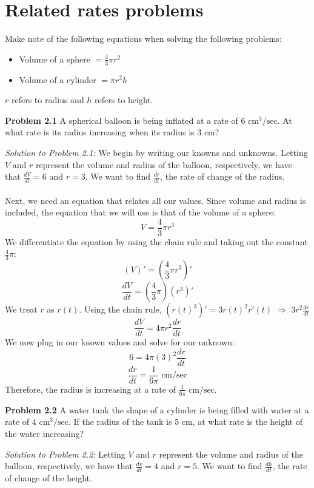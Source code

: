 \documentclass[11pt]{scrartcl}
\begin{document}
\section{Related rates problems}
\noindent 
Make note of the following equations when solving the following problems: 
\begin{itemize}
    \item Volume of a sphere $=\frac{4}{3}\pi r^2$
    \item Volume of a cylinder $=\pi r^2 h$
\end{itemize}
\noindent 
$r$ refers to radius and $h$ refers to height. 
\begin{tcolorbox}
[colback=purple!5!white,colframe=purple!75!black]
\textbf{Problem 2.1} A spherical balloon is being inflated at a rate of 6 ${\text{cm}^3/\text{sec}}$. At what rate is its radius increasing when its radius is 3 cm?
\end{tcolorbox}
\noindent
\textit{Solution to Problem 2.1:} We begin by writing our knowns and unknowns. Letting $V$ and $r$ represent the volume and radius of the balloon, respectively, we have that $\frac{dV}{dt}=6$ and $r=3$. We want to find $\frac{dr}{dt}$, the rate of change of the radius. \\
\\
\noindent 
Next, we need an equation that relates all our values. Since volume and radius is included, the equation that we will use is that of the volume of a sphere: 
$$V=\frac{4}{3}\pi r^3$$
We differentiate the equation by using the chain rule and taking out the constant $\frac{4}{3}\pi$:
$$(V)'=\left(\frac{4}{3}\pi r^3\right)'$$
$$\frac{dV}{dt}=\left(\frac{4}{3}\pi\right)(r^3)'$$
We treat $r$ as $r(t)$. Using the chain rule, $(r(t)^3)'=3r(t)^2r'(t)$ $\Rightarrow$ \;$3r^2\frac{dr}{dt}$
$$\frac{dV}{dt}=4\pi r^2\frac{dr}{dt}$$
We now plug in our known values and solve for our unknown:
$$6=4\pi (3)^2\frac{dr}{dt}$$
$$\frac{dr}{dt}=\frac{1}{6\pi} \; \text{cm/sec}$$
\noindent 
Therefore, the radius is increasing at a rate of $\frac{1}{6\pi} \; \text{cm/sec}$. 
\noindent\\
\begin{tcolorbox}
[colback=purple!5!white,colframe=purple!75!black]
\textbf{Problem 2.2} A water tank the shape of a cylinder is being filled with water at a rate of 
 4 $\text{cm}^3/\text{sec}$. If the radius of the tank is 5 cm, at what rate is the height of the water increasing?
\end{tcolorbox}
\noindent
\textit{Solution to Problem 2.2:} Letting $V$ and $r$ represent the volume and radius of the balloon, respectively, we have that $\frac{dv}{dt}=4$ and $r=5$. We want to find $\frac{dh}{dt}$, the rate of change of the height. \\
\end{document}
